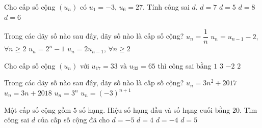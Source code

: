 \begin{ex}%
	Cho cấp số  cộng $(u_n)$ có $u_1=-3$, $u_6=27$. Tính công sai $d$.
	\choice 
		{$d=7$} 
		{$d=5$} 
		{$d=8$} 
		 {\True $d=6$}
\end{ex}

\begin{ex}%
	Trong các dãy số nào sau  đây, dãy số nào là cấp số cộng?
	 \choice
		{$u_n=\dfrac{1}{n}$} 
		{\True $u_n=u_{n-1}-2$, $\forall  n \ge 2$}
		 {$u_n=2^n-1$}
		{$u_n=2u_{n-1}$,  $\forall n \ge 2$}
\end{ex}

\begin{ex}%
	Cho cấp số cộng  $(u_n)$ với $u_{17}=33$ và $u_{33}=65$ thì công sai bằng
	 \choice
		{$1$} 
		 {$3$}
		{$-2$} 
		{\True $2$} 
\end{ex}

\begin{ex}%
	Trong các dãy số nào sau  đây, dãy số nào là cấp số cộng?
	 \choice
		 {$u_n=3n^2+2017$}
		 {\True $u_n=3n+2018$}
		{$u_n=3^n$} 
		{$u_n=(-3)^{n+1}$} 
\end{ex}

\begin{ex}%
	Một cấp số cộng  gồm $5$ số hạng. Hiệu số hạng đầu và số hạng cuối bằng $20$. Tìm công sai $d$ của cấp số cộng đã cho
	\choice 
		{\True $d=-5$} 
		{$d=4$} 
		 {$d=-4$}
		{$d=5$} 
\end{ex}

